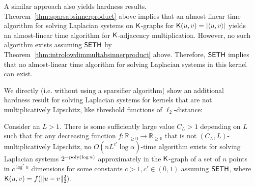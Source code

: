 A similar approach also yields hardness results. Theorem~\ref{thm:sparsabsinnerproduct} above implies that an almost-linear time algorithm for solving Laplacian systems on $\mathsf{K}$-graphs for $\mathsf{K}(u,v) = |\langle u,v\rangle |$ yields an almost-linear time algorithm for $\mathsf{K}$-adjacency multiplication. However, no such algorithm exists assuming $\mathsf{SETH}$ by Theorem~\ref{thm:introlowdimmultabsinnerproduct} above. Therefore, $\mathsf{SETH}$ implies that no almost-linear time algorithm for solving Laplacian systems in this kernel can exist.

We directly (i.e. without using a sparsifier algorithm) show an additional hardness result for solving Laplacian systems for kernels that are not multiplicatively Lipschitz, like threshold functions of $\ell_2$-distance:

\begin{theorem}
Consider an $L > 1$. There is some sufficiently large value $C_L > 1$ depending on $L$ such that for any decreasing function $f:\mathbb{R}_{\ge 0}\rightarrow \mathbb{R}_{\ge 0}$ that is not $(C_L,L)$-multiplicatively Lipschitz, no $O(n L^{c'} \log \alpha)$-time algorithm exists for solving Laplacian systems $2^{-\mathrm{poly}(\log n)}$ approximately in the $\mathsf{K}$-graph of a set of $n$ points in $c^{\log^* n}$ dimensions for some constants $c > 1, c'\in (0,1)$ assuming $\mathsf{SETH}$, where $\mathsf{K}(u,v) = f(\|u-v\|_2^2)$.
\end{theorem}
